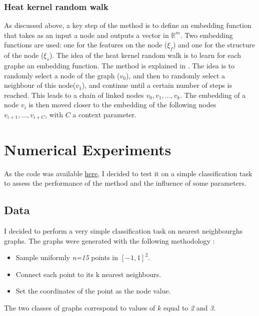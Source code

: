 \documentclass[a4paper,11pt]{article}
\begin{document}
\subsubsection{Heat kernel random walk}

As discussed above, a key step of the method is to define an embedding function that takes as an input a node and outputs a vector in $\mathbb{R}^m$.
Two embedding functions are used: one for the features on the node ($\xi_f$) and one for the structure of the node ($\xi_s$).
The idea of the heat kernel random walk is to learn for each graphe an embedding function. 
The method is explained in \cite{abu2018watch}. 
The idea is to randomly select a node of the graph ($v_0$), and then to randomly select a neighbour of this node($v_1$), and continue until a certain number of steps is reached.
This leads to a chain of linked nodes $v_0, v_1, ..., v_k$.
The embedding of a node $v_i$ is then moved closer to the embedding of the following nodes $ v_{i+1}, \dots, v_{i+C} $, with $C$ a context parameter. 


\section{Numerical Experiments}

As the code was available \href{https://github.com/wokas36/RWK}{here}, I decided to test it on a simple classification task to assess the performance of the method and the influence of some parameters. 

\subsection{Data}

I decided to perform a very simple classification task on nearest neighbourghs graphs. 
The graphs were generated with the following methodology : \\
\begin{itemize}
    \item Sample uniformly \textit{n=15} points in $[-1, 1]^2$. 
    \item Connect each point to its k nearest neighbours.
    \item Set the coordinates of the point as the node value. \\
\end{itemize}

The two classes of graphs correspond to values of $k$ equal to \textit{2} and \textit{3}.
\end{document}
